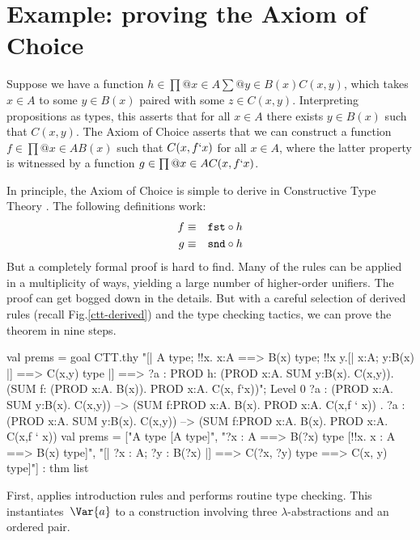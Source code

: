 \section{Example: proving the Axiom of Choice} \label{ctt-choice}
Suppose we have a function $h\in \prod@{x\in A}\sum@{y\in B(x)} C(x,y)$,
which takes $x\in A$ to some $y\in B(x)$ paired with some $z\in C(x,y)$.
Interpreting propositions as types, this asserts that for all $x\in A$
there exists $y\in B(x)$ such that $C(x,y)$.  The Axiom of Choice asserts
that we can construct a function $f\in \prod@{x\in A}B(x)$ such that
$C(x,f{\tt`}x)$ for all $x\in A$, where the latter property is witnessed by a
function $g\in \prod@{x\in A}C(x,f{\tt`}x)$.

In principle, the Axiom of Choice is simple to derive in Constructive Type
Theory \cite[page~50]{martinlof84}.  The following definitions work:
\begin{eqnarray*}
    f & \equiv & {\tt fst} \circ h \\
    g & \equiv & {\tt snd} \circ h
\end{eqnarray*}
But a completely formal proof is hard to find.  Many of the rules can be
applied in a multiplicity of ways, yielding a large number of higher-order
unifiers.  The proof can get bogged down in the details.  But with a
careful selection of derived rules (recall Fig.\ts\ref{ctt-derived}) and
the type checking tactics, we can prove the theorem in nine steps.
\begin{ttbox}
val prems = goal CTT.thy
    "[| A type;  !!x. x:A ==> B(x) type;                    \ttback
\ttback       !!x y.[| x:A;  y:B(x) |] ==> C(x,y) type            \ttback
\ttback    |] ==> ?a : PROD h: (PROD x:A. SUM y:B(x). C(x,y)).    \ttback
\ttback                     (SUM f: (PROD x:A. B(x)). PROD x:A. C(x, f`x))";
{\out Level 0}
{\out ?a : (PROD x:A. SUM y:B(x). C(x,y)) -->}
{\out      (SUM f:PROD x:A. B(x). PROD x:A. C(x,f ` x))}
{. ?a : (PROD x:A. SUM y:B(x). C(x,y)) -->}
{\out          (SUM f:PROD x:A. B(x). PROD x:A. C(x,f ` x))}
\ttbreak
{\out val prems = ["A type  [A type]",}
{\out              "?x : A ==> B(?x) type  [!!x. x : A ==> B(x) type]",}
{\out              "[| ?x : A; ?y : B(?x) |] ==> C(?x, ?y) type}
{\out               [!!x y. [| x : A; y : B(x) |] ==> C(x, y) type]"]}
{\out             : thm list}
\end{ttbox}
First,  applies introduction rules and performs routine
type checking.  This instantiates~$\Var{a}$ to a construction involving
three $\lambda$-abstractions and an ordered pair.
